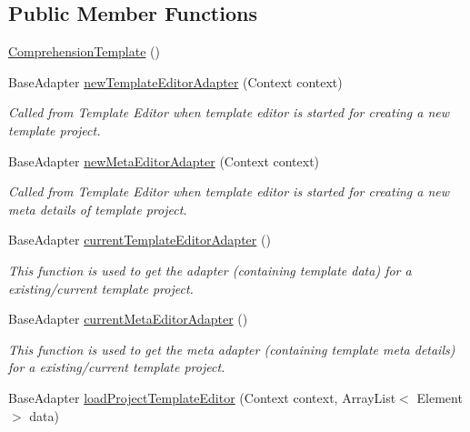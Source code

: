 \subsection*{Public Member Functions}
\begin{DoxyCompactItemize}
\item 
\hyperlink{classorg_1_1buildmlearn_1_1toolkit_1_1templates_1_1ComprehensionTemplate_aec3483152642c7fda3cf222b3ee8571c}{Comprehension\+Template} ()
\item 
Base\+Adapter \hyperlink{classorg_1_1buildmlearn_1_1toolkit_1_1templates_1_1ComprehensionTemplate_ae260425a03f90cb973f7bdac1cd60fc1}{new\+Template\+Editor\+Adapter} (Context context)
\begin{DoxyCompactList}\small\item\em Called from Template Editor when template editor is started for creating a new template project. \end{DoxyCompactList}\item 
Base\+Adapter \hyperlink{classorg_1_1buildmlearn_1_1toolkit_1_1templates_1_1ComprehensionTemplate_a28470e1c3c390e13d6d19d938709c4d3}{new\+Meta\+Editor\+Adapter} (Context context)
\begin{DoxyCompactList}\small\item\em Called from Template Editor when template editor is started for creating a new meta details of template project. \end{DoxyCompactList}\item 
Base\+Adapter \hyperlink{classorg_1_1buildmlearn_1_1toolkit_1_1templates_1_1ComprehensionTemplate_a818630f24655e6ec667efade732b7a8a}{current\+Template\+Editor\+Adapter} ()
\begin{DoxyCompactList}\small\item\em This function is used to get the adapter (containing template data) for a existing/current template project. \end{DoxyCompactList}\item 
Base\+Adapter \hyperlink{classorg_1_1buildmlearn_1_1toolkit_1_1templates_1_1ComprehensionTemplate_a9e68ce2d6505b81309e989fd231fead4}{current\+Meta\+Editor\+Adapter} ()
\begin{DoxyCompactList}\small\item\em This function is used to get the meta adapter (containing template meta details) for a existing/current template project. \end{DoxyCompactList}\item 
Base\+Adapter \hyperlink{classorg_1_1buildmlearn_1_1toolkit_1_1templates_1_1ComprehensionTemplate_a4e8d3551715f6984f7c8a0aa618de660}{load\+Project\+Template\+Editor} (Context context, Array\+List$<$ Element $>$ data)

\end{DoxyCompactItemize}
